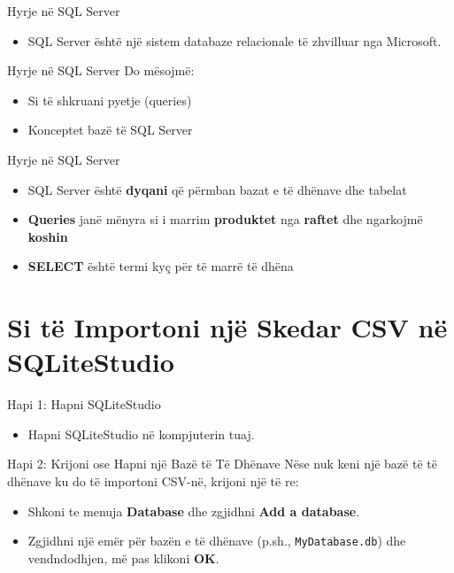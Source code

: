 \documentclass[
  ignorenonframetext,
]{beamer}
\providecommand{\tightlist}{%
  \setlength{\itemsep}{0pt}\setlength{\parskip}{0pt}}
\begin{document}
\begin{frame}{Hyrje në SQL Server}
\label{hyrje-nuxeb-sql-server}
\begin{itemize}
\tightlist
\item
  SQL Server është një sistem databaze relacionale të zhvilluar nga
  Microsoft.
\end{itemize}
\end{frame}

\begin{frame}{Hyrje në SQL Server}
\label{hyrje-nuxeb-sql-server-1}
Do mësojmë:

\begin{itemize}
\item
  Si të shkruani pyetje (queries)
\item
  Konceptet bazë të SQL Server
\end{itemize}
\end{frame}

\begin{frame}{Hyrje në SQL Server}
\label{hyrje-nuxeb-sql-server-2}
\begin{itemize}
\item
  SQL Server është \textbf{dyqani} që përmban bazat e të dhënave dhe
  tabelat
\item
  \textbf{Queries} janë mënyra si i marrim \textbf{produktet} nga
  \textbf{raftet} dhe ngarkojmë \textbf{koshin}
\item
  \textbf{SELECT} është termi kyç për të marrë të dhëna
\end{itemize}
\end{frame}

\section{Si të Importoni një Skedar CSV në
SQLiteStudio}\label{si-tuxeb-importoni-njuxeb-skedar-csv-nuxeb-sqlitestudio}

\begin{frame}{Hapi 1: Hapni SQLiteStudio}
\label{hapi-1-hapni-sqlitestudio}
\begin{itemize}
\tightlist
\item
  Hapni SQLiteStudio në kompjuterin tuaj.
\end{itemize}
\end{frame}

\begin{frame}[fragile]{Hapi 2: Krijoni ose Hapni një Bazë të Të Dhënave}
\label{hapi-2-krijoni-ose-hapni-njuxeb-bazuxeb-tuxeb-tuxeb-dhuxebnave}
Nëse nuk keni një bazë të të dhënave ku do të importoni CSV-në, krijoni
një të re:

\begin{itemize}
\item
  Shkoni te menuja \textbf{Database} dhe zgjidhni \textbf{Add a
  database}.
\item
  Zgjidhni një emër për bazën e të dhënave (p.sh.,
  \texttt{MyDatabase.db}) dhe vendndodhjen, më pas klikoni \textbf{OK}.
\end{itemize}
\end{frame}
\end{document}
